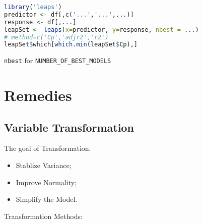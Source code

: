 \begin{rcode}
\begin{lstlisting}[language=R]
library('leaps')
predictor <- df[,c('...','...',...)]
response <- df[,...]
leapSet <- leaps(x=predictor, y=response, nbest = ...)
# method=c('Cp','adjr2','r2')
leapSet$which[which.min(leapSet$Cp),]
\end{lstlisting}
    
    \lstinline|nbest| for \lstinline|NUMBER_OF_BEST_MODELS|
\end{rcode}





















\section{Remedies}

\subsection{Variable Transformation}\label{SubSubSectionVarianceStablizeTransformation}
    The goal of Transformation:
        
        \begin{itemize}[topsep=2pt,itemsep=2pt]
            \item Stablize Variance;
            \item Improve Normality;
            \item Simplify the Model.
        \end{itemize}
    
    \begin{point}
        Transformation Methods:
    \end{point}
    
